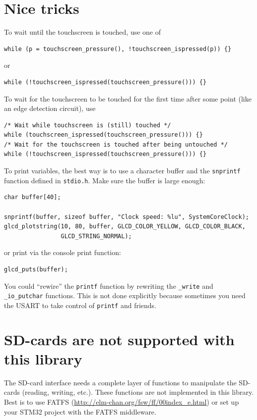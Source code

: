 \documentclass[12pt]{article}
\makeatletter
\newcommand{\ifunc}[1]{\index{#1@\texttt{#1}}}
\makeatother
\begin{document}
\section{Nice tricks}
To wait until the touchscreen is touched, use one of

\begin{lstlisting}
while (p = touchscreen_pressure(), !touchscreen_ispressed(p)) {}
\end{lstlisting}

or

\begin{lstlisting}
while (!touchscreen_ispressed(touchscreen_pressure())) {}
\end{lstlisting}

To wait for the touchscreen to be touched for the first time after some point (like an edge detection circuit), use

\begin{lstlisting}
/* Wait while touchscreen is (still) touched */
while (touchscreen_ispressed(touchscreen_pressure())) {}
/* Wait for the touchscreen is touched after being untouched */
while (!touchscreen_ispressed(touchscreen_pressure())) {}
\end{lstlisting}

To print variables, the best way is to use a character buffer and the \lstinline|snprintf| \ifunc{snprintf} function defined in \lstinline|stdio.h|. Make sure the buffer is large enough:

\begin{lstlisting}
char buffer[40];

snprintf(buffer, sizeof buffer, "Clock speed: %lu", SystemCoreClock);
glcd_plotstring(10, 80, buffer, GLCD_COLOR_YELLOW, GLCD_COLOR_BLACK,
                GLCD_STRING_NORMAL);
\end{lstlisting}

or print via the console print function:

\begin{lstlisting}
glcd_puts(buffer);
\end{lstlisting}

You could ``rewire'' the \lstinline|printf| function by rewriting the \lstinline|_write| and \lstinline|_io_putchar| functions. This is not done explicitly because sometimes you need the USART to take control of \lstinline|printf| and friends.


\section{SD-cards are not supported with this library}
The SD-card interface needs a complete layer of functions to manipulate the SD-cards (reading, writing, etc.). These functions are not implemented in this library. Best is to use FATFS (\url{http://elm-chan.org/fsw/ff/00index_e.html}) or set up your STM32 project with the FATFS middleware.
\end{document}
